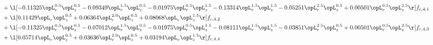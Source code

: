 \begin{alignat}{2}
& + \l[  -0.11325 \opL_r^{0.5} \opL_z^{0.5}   -0.09349 \opL_r^{1.5} \opL_z^{0.5}   -0.01975 \opL_r^{0.5} \opL_z^{1.5}   -0.13314 \opL_r^{1.5} \opL_z^{1.5}   -0.05251 \opL_r^{2.5} \opL_z^{0.5} +  0.00501 \opL_r^{0.5} \opL_z^{2.5}  \r] f_{c,4,1} \nonumber \\ 
& + \l[  0.11429 \opL_r \opL_z^{0.5} +  0.06364 \opL_r^{2.0} \opL_z^{0.5} +  0.08068 \opL_r \opL_z^{1.5}  \r] f_{c,4,2} \nonumber \\ 
& + \l[  -0.11325 \opL_r^{0.5} \opL_z^{0.5}   -0.07012 \opL_r^{1.5} \opL_z^{0.5}   -0.01975 \opL_r^{0.5} \opL_z^{1.5}   -0.08111 \opL_r^{1.5} \opL_z^{1.5}   -0.03851 \opL_r^{2.5} \opL_z^{0.5} +  0.00501 \opL_r^{0.5} \opL_z^{2.5}  \r] f_{c,4,3} \nonumber \\ 
& + \l[  0.05714 \opL_r \opL_z^{0.5} +  0.03636 \opL_r^{2.0} \opL_z^{0.5} +  0.03194 \opL_r \opL_z^{1.5}  \r] f_{c,4,4} \nonumber \\ 
\end{alignat} 


